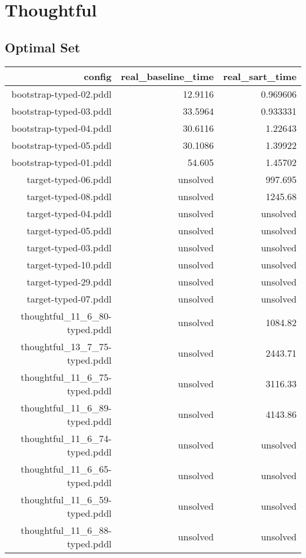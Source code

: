 \documentclass{article}
\begin{document}
                \newpage \section{Thoughtful}
                    \subsection*{Optimal Set}
                    
                            \begin{center}
                            \scriptsize
                            \begin{tabular}{r|r|r}
                            config & real\_baseline\_time & real\_sart\_time\\\midrule
                             bootstrap-typed-02.pddl&12.9116&0.969606\\
 bootstrap-typed-03.pddl&33.5964&0.933331\\
 bootstrap-typed-04.pddl&30.6116&1.22643\\
 bootstrap-typed-05.pddl&30.1086&1.39922\\
 bootstrap-typed-01.pddl&54.605&1.45702\\
 target-typed-06.pddl&unsolved&997.695\\
 target-typed-08.pddl&unsolved&1245.68\\
 target-typed-04.pddl&unsolved&unsolved\\
 target-typed-05.pddl&unsolved&unsolved\\
 target-typed-03.pddl&unsolved&unsolved\\
 target-typed-10.pddl&unsolved&unsolved\\
 target-typed-29.pddl&unsolved&unsolved\\
 target-typed-07.pddl&unsolved&unsolved\\
 thoughtful\_11\_6\_80-typed.pddl&unsolved&1084.82\\
 thoughtful\_13\_7\_75-typed.pddl&unsolved&2443.71\\
 thoughtful\_11\_6\_75-typed.pddl&unsolved&3116.33\\
 thoughtful\_11\_6\_89-typed.pddl&unsolved&4143.86\\
 thoughtful\_11\_6\_74-typed.pddl&unsolved&unsolved\\
 thoughtful\_11\_6\_65-typed.pddl&unsolved&unsolved\\
 thoughtful\_11\_6\_59-typed.pddl&unsolved&unsolved\\
 thoughtful\_11\_6\_88-typed.pddl&unsolved&unsolved\\

\end{tabular}
\end{center}
\end{document}
